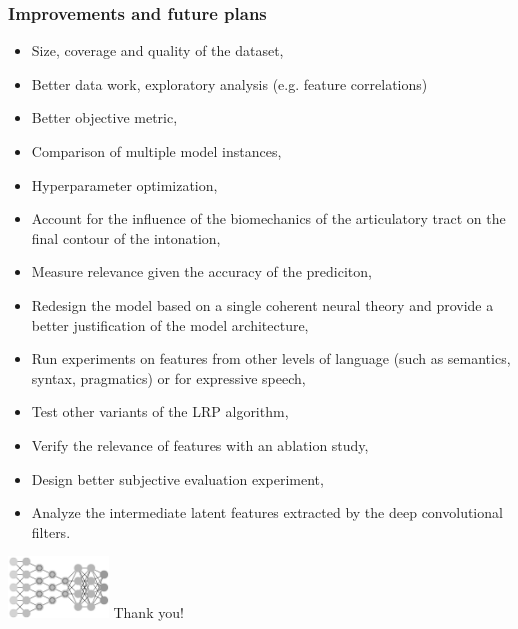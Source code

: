 \documentclass[a4paper,9pt]{beamer}
\theoremstyle{mytheoremstyle}
\begin{document}
\begin{frame}
\frametitle{Improvements and future plans}
\scriptsize{
\begin{exampleblock}{}
\begin{itemize}
\item[\checkmark] Size, coverage and quality of the dataset,
\item[\checkmark] Better data work, exploratory analysis (e.g. feature correlations)
\item[\checkmark] Better objective metric,
\item[\checkmark] Comparison of multiple model instances,
\item[\checkmark] Hyperparameter optimization,
\item[\checkmark] Account for the influence of the biomechanics of the articulatory tract on the final
contour of the intonation,
\item[\checkmark] Measure relevance given the accuracy of the prediciton,
\item[\checkmark] Redesign the model based on a single coherent neural theory and provide a better justification of the model architecture,
\item[\checkmark] Run experiments on features from other levels of language (such as semantics, syntax, pragmatics) or for expressive speech,
\item[\checkmark] Test other variants of the LRP algorithm,
\item[\checkmark] Verify the relevance of features with an ablation study,
\item[\checkmark] Design better subjective evaluation experiment,
\item[\checkmark] Analyze the intermediate latent features extracted by the deep convolutional filters.
\end{itemize}
\end{exampleblock}
}
\end{frame}

\begin{frame}
\begin{center}
\includegraphics[width=0.2\textwidth]{res/cnn_gray}
\vspace{1cm}
Thank you!
\end{center}
\end{frame}
\end{document}
